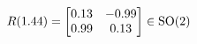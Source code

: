 \documentclass[preview]{standalone}
\begin{document}
\begin{align*}
\special{dvisvgm:raw <g id='unique000'>}R(1.44) = \begin{bmatrix} 0.13 & -0.99 \\ 0.99 & 0.13 \end{bmatrix} \in \text{SO}(2)\special{dvisvgm:raw </g>}
\end{align*}
\end{document}

